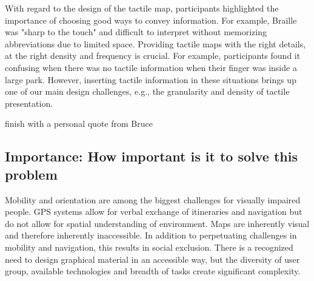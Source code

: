 With regard to the design of the tactile map, participants highlighted the importance of choosing good ways to convey information. For example, Braille was "sharp to the touch" and difficult to interpret without memorizing abbreviations due to limited space. Providing tactile maps with the right details, at the right density and frequency is crucial. For example, participants found it confusing when there was no tactile information when their finger was inside a large park. However, inserting tactile information in these situations brings up one of our main design challenges, e.g., the granularity and density of tactile presentation.



\ac{finish with a personal quote from Bruce}


\subsection{Importance: How important is it to solve this problem }

Mobility and orientation are among the biggest challenges for visually impaired people.
GPS systems allow for verbal exchange of itineraries and navigation but do not allow for spatial understanding of environment. 
Maps are inherently visual and therefore inherently inaccessible. 
In addition to perpetuating challenges in mobility and navigation, this results in social exclusion. There is a recognized need to design graphical material in an accessible way, but the diversity of user group, available technologies and breadth of tasks create significant  complexity. 


